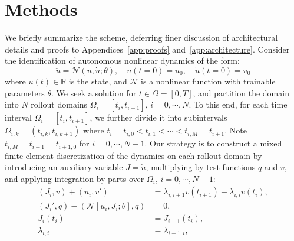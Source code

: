 \documentclass[12pt]{article}
\newcommand{\R}{\mathbb{R}}
\begin{document}
\section{Methods}\label{sec:methods}


We briefly summarize the scheme, deferring finer discussion of architectural details and proofs to Appendices~\ref{app:proofs} and~\ref{app:architecture}. Consider the identification of autonomous nonlinear dynamics of the form:
\begin{equation}\label{eq:dynCont}
    \ddot{u} = \mathcal{N}(u, \dot{u}; \theta),\quad
    u(t=0) = u_0, \quad \dot{u}(t=0) = v_0
\end{equation}
where $u(t) \in \R$ is the state, and $\mathcal{N}$ is a nonlinear function with trainable parameters $\theta$. We seek a solution for $t \in \Omega = [0,T] $, and partition the domain into $N$ rollout domains $\Omega_i = [t_i, t_{i+1}]$, $i=0, \cdots, N$.   To this end, for each time interval $\Omega_i = [t_i, t_{i+1}]$, we further divide it into subintervals $\Omega_{i,k} = (t_{i,k}, t_{i,k+1})$ where $t_i = t_{i,0} < t_{i,1} < \cdots < t_{i, M} = t_{i+1}$. Note $t_{i, M} = t_{i+1} = t_{i+1,0}$ for $i = 0, \cdots, N-1$.  Our strategy is to construct a mixed finite element discretization of the dynamics on each rollout domain by introducing an auxiliary variable $J = \dot{u}$, multiplying by test functions $q$ and $v$, and applying integration by parts over $\Omega_{i}$, $i=0, \cdots, N-1$:
\begin{equation}\label{eq:mixedGalerkin}
\begin{aligned}
    (J_i, v) + (u_i, v') &= \lambda_{i, i+1} v(t_{i+1}) - \lambda_{i,i} v(t_i), \\
    (J_i', q) - (\mathcal{N}[u_i,J_i;\theta], q) &= 0, \\
    J_i(t_i) &= J_{i-1}(t_i),  \\
    \lambda_{i,i} &= \lambda_{i-1,i},  \\
\end{aligned}
\end{equation}
\end{document}
